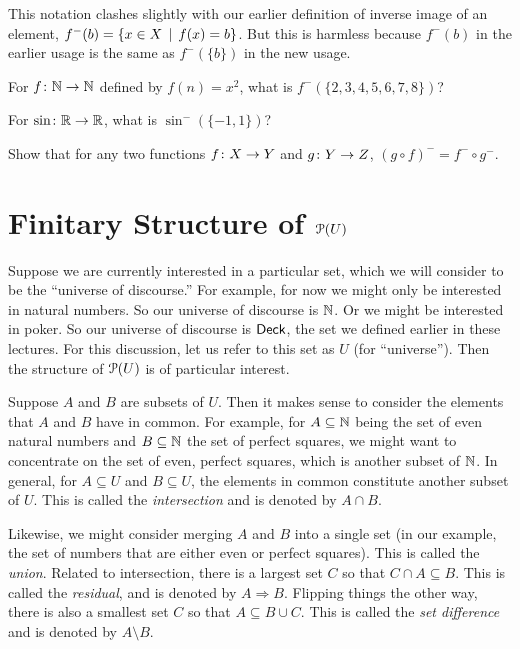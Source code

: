 This notation clashes slightly with our earlier definition of inverse image of an element, $f^-(b) = \{x\in X\,\mid\, f(x)=b\}$. But this is harmless because 
$f^-(b)$ in the earlier usage is the same as $f^-(\{b\})$ in the new usage.

\begin{exercises}
	\begin{firstexercise}
		\item For ${f}\colon{\mathbb N}\to{\mathbb N}$ defined by $f(n) = x^2$, what is $f^-(\{2,3,4,5,6,7,8\})$?
		\item For ${\sin}\colon{\mathbb R}\to{\mathbb R}$, what is $\sin^-(\{-1,1\})$?
		\item Show that for any two functions ${f}\colon{X}\to{Y}$ and ${g}\colon{Y}\to{Z}$, $(g\circ f)^- = f^-\circ g^-$.
	\end{firstexercise}
\end{exercises}

\section{Finitary Structure of ${\mathcal{P}}(U)$}

Suppose we are currently interested in a particular set, which we will consider to be the ``universe of discourse.'' For example, for now we might only be interested in natural numbers. So our universe of discourse is $\mathbb N$. Or we might be interested in poker. So our universe of discourse is ${\mathord{\textsf{Deck}}}$, the set we defined earlier in these lectures. For this discussion, let us refer to this set as $U$ (for ``universe''). Then the structure of ${\mathcal{P}}(U)$ is of particular interest.

Suppose $A$ and $B$ are subsets of $U$. 
Then it makes sense to consider the elements that $A$ and $B$ have in common. 
For example, for $A\subseteq \mathbb N$ being the set of even natural numbers and $B\subseteq \mathbb N$ the set of perfect squares, we might want to concentrate on the set of even, perfect squares, which is another subset of $\mathbb N$.
In general, for $A\subseteq U$ and $B\subseteq U$, the elements in common constitute another subset of $U$.
This is called the \emph{intersection} and is denoted by $A\cap B$.

Likewise, we might consider merging $A$ and $B$ into a single set (in our example, the set of numbers that are either even or perfect squares).
This is called the \emph{union}.
Related to intersection, there is a largest set $C$ so that $C\cap A\subseteq B$. 
This is called the \emph{residual}, and is denoted by $A\Rightarrow B$.
Flipping things the other way, there is also a smallest set $C$ so that $A\subseteq B\cup C$. This is called the \emph{set difference} and is denoted by $A\setminus B$. 

